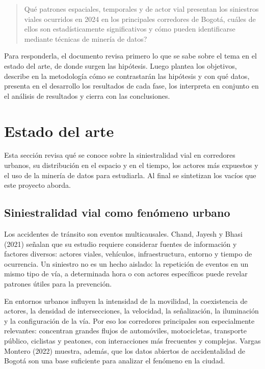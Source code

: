 \documentclass[12pt,letterpaper]{article}
\begin{document}
\begin{quote}
{\selectfont\textquestiondown}Qué patrones espaciales, temporales y de actor vial presentan los
siniestros viales ocurridos en 2024 en los principales corredores de
Bogotá, cuáles de ellos son estadísticamente significativos y cómo
pueden identificarse mediante técnicas de minería de datos?
\end{quote}

Para responderla, el documento revisa primero lo que se sabe sobre el
tema en el estado del arte, de donde surgen las hipótesis. Luego plantea
los objetivos, describe en la metodología cómo se contrastarán las
hipótesis y con qué datos, presenta en el desarrollo los resultados de
cada fase, los interpreta en conjunto en el análisis de resultados y
cierra con las conclusiones.

\clearpage
\hypertarget{estado-del-arte}{%
\section{Estado del arte}\label{estado-del-arte}}

Esta sección revisa qué se conoce sobre la siniestralidad vial en
corredores urbanos, su distribución en el espacio y en el tiempo, los
actores más expuestos y el uso de la minería de datos para estudiarla.
Al final se sintetizan los vacíos que este proyecto aborda.

\hypertarget{siniestralidad-vial-como-fenuxf3meno-urbano}{%
\subsection{Siniestralidad vial como fenómeno
urbano}\label{siniestralidad-vial-como-fenuxf3meno-urbano}}

Los accidentes de tránsito son eventos multicausales. Chand, Jayesh y
Bhasi (2021) señalan que su estudio requiere considerar fuentes de
información y factores diversos: actores viales, vehículos,
infraestructura, entorno y tiempo de ocurrencia. Un siniestro no es un
hecho aislado: la repetición de eventos en un mismo tipo de vía, a
determinada hora o con actores específicos puede revelar patrones útiles
para la prevención.

En entornos urbanos influyen la intensidad de la movilidad, la
coexistencia de actores, la densidad de intersecciones, la velocidad, la
señalización, la iluminación y la configuración de la vía. Por eso los
corredores principales son especialmente relevantes: concentran grandes
flujos de automóviles, motocicletas, transporte público, ciclistas y
peatones, con interacciones más frecuentes y complejas. Vargas Montero
(2022) muestra, además, que los datos abiertos de accidentalidad de
Bogotá son una base suficiente para analizar el fenómeno en la ciudad.
\end{document}

